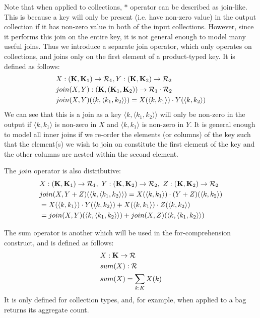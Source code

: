{{{Note that when applied to collections, $*$ operator can be described as join-like. This is because a key will only be present (i.e. have non-zero value) in the output collection if it has non-zero value in both of the input collections. However, since it performs this join on the entire key, it is not general enough to model many useful joins. Thus we introduce a separate join operator, which only operates on collections, and joins only on the first element of a product-typed key. It is defined as follows:
\begin{equation*}
\begin{split}
& X: (\mathbf{K},\mathbf{K}_1) \rightarrow \mathcal{R}_1,  Y: (\mathbf{K},\mathbf{K}_2) \rightarrow \mathcal{R}_2 \\
& join(X, Y): (\mathbf{K}, (\mathbf{K}_1,\mathbf{K}_2)) \rightarrow \mathcal{R}_1 \cdot \mathcal{R}_2 \\
& join(X, Y)(\langle k, \langle k_1, k_2 \rangle \rangle) = X(\langle k, k_1 \rangle) \cdot Y(\langle k, k_2 \rangle)
\end{split}
\end{equation*}
We can see that this is a join as a key $\langle k, \langle k_1, k_2 \rangle \rangle$ will only be non-zero in the output if $\langle k, k_1 \rangle$ is non-zero in $X$ and $\langle k, k_1 \rangle$ is non-zero in $Y$. It is general enough to model all inner joins if we re-order the elements (or columns) of the key such that the element(s) we wish to join on constitute the first element of the key and the other columns are nested within the second element. 

\noindent The $join$ operator is also distributive:
\begin{equation*}
\begin{split}
&X: (\mathbf{K},\mathbf{K}_1) \rightarrow \mathcal{R}_1,  \ Y: (\mathbf{K},\mathbf{K}_2) \rightarrow \mathcal{R}_2, \ Z: (\mathbf{K},\mathbf{K}_2) \rightarrow \mathcal{R}_2 \\
&join(X,Y+Z)(\langle k, \langle k_1, k_2 \rangle \rangle) = X(\langle k, k_1 \rangle) \cdot (Y+Z)(\langle k, k_2 \rangle) \\
&=X(\langle k, k_1 \rangle) \cdot Y(\langle k, k_2 \rangle) + X(\langle k, k_1 \rangle) \cdot Z(\langle k, k_2 \rangle) \\
&=join(X,Y)(\langle k, \langle k_1, k_2 \rangle \rangle) + join(X,Z)(\langle k, \langle k_1, k_2 \rangle \rangle)
\end{split}
\end{equation*}

The sum operator is another which will be used in the for-comprehension construct, and is defined as follows: 
\begin{equation*}
\begin{split}
 & X: \mathbf{K} \rightarrow \mathcal{R} \\
 & sum(X): \mathcal{R} \\
 & sum(X) = \sum_{k: K} X(k)
\end{split}
\end{equation*}
It is only defined for collection types, and, for example, when applied to a bag returns its aggregate count.
 
}}}
